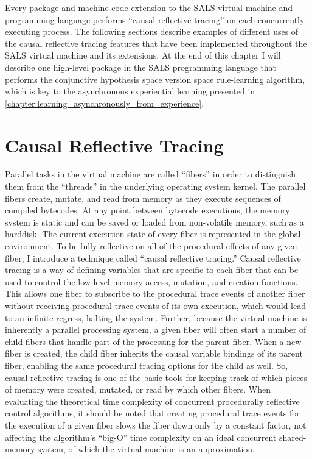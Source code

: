 Every package and machine code extension to the SALS virtual machine
and programming language performs ``causal reflective tracing'' on
each concurrently executing process.  The following sections describe
examples of different uses of the causal reflective tracing features
that have been implemented throughout the SALS virtual machine and its
extensions.  At the end of this chapter I will describe one high-level
package in the SALS programming language that performs the conjunctive
hypothesis space version space rule-learning algorithm, which is key
to the asynchronous experiential learning presented in
{\mbox{\autoref{chapter:learning_asynchronously_from_experience}}}.

\section{Causal Reflective Tracing}

Parallel tasks in the virtual machine are called ``fibers'' in order
to distinguish them from the ``threads'' in the underlying operating
system kernel.  The parallel fibers create, mutate, and read from
memory as they execute sequences of compiled bytecodes.  At any point
between bytecode executions, the memory system is static and can be
saved or loaded from non-volatile memory, such as a harddisk.  The
current execution state of every fiber is represented in the global
environment.  To be fully reflective on all of the procedural effects
of any given fiber, I introduce a technique called ``causal reflective
tracing.''  Causal reflective tracing is a way of defining variables
that are specific to each fiber that can be used to control the
low-level memory access, mutation, and creation functions.  This
allows one fiber to subscribe to the procedural trace events of
another fiber without receiving procedural trace events of its own
execution, which would lead to an infinite regress, halting the
system.  Further, because the virtual machine is inherently a parallel
processing system, a given fiber will often start a number of child
fibers that handle part of the processing for the parent fiber.  When
a new fiber is created, the child fiber inherits the causal variable
bindings of its parent fiber, enabling the same procedural tracing
options for the child as well.  So, causal reflective tracing is one
of the basic tools for keeping track of which pieces of memory were
created, mutated, or read by which other fibers.  When evaluating the
theoretical time complexity of concurrent procedurally reflective
control algorithms, it should be noted that creating procedural trace
events for the execution of a given fiber slows the fiber down only by
a constant factor, not affecting the algorithm's ``big-O'' time
complexity on an ideal concurrent shared-memory system, of which the
virtual machine is an approximation.

